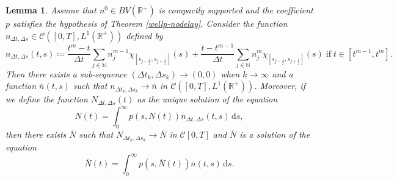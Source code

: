 \documentclass[11pt,a4paper]{article}
\newcommand{\R}{\mathbb{R}}
\newcommand{\N}{\mathbb{N}}
\newcommand{\dd}{\mathrm{d}}
\newtheorem{lemma}{Lemma}[section]
\begin{document}
\begin{lemma}
\label{lim-delta}
    Assume that $n^0\in BV(\R^+)$ is compactly supported and the coefficient $p$ satisfies the hypothesis of Theorem \ref{wellp-nodelay}. Consider the function $n_{\Delta t,\Delta s}\in\mathcal{C}\left([0,T],L^1(\R^+)\right)$ defined by
    \begin{equation}
    \label{n-interp}
      n_{\Delta t,\Delta s}(t,s)\coloneqq\frac{t^m-t}{\Delta t}\sum_{j\in\N}n_j^{m-1}\chi_{[s_{j-\frac{1}{2}},s_{j+\frac{1}{2}}]}(s)+\frac{t-t^{m-1}}{\Delta t}\sum_{j\in\N}n_j^{m}\chi_{[s_{j-\frac{1}{2}},s_{j+\frac{1}{2}}]}(s)\;\textrm{if}\; t\in[t^{m-1},t^{m}].  
    \end{equation}
    Then there exists a sub-sequence $(\Delta t_k,\Delta s_k)\to (0,0)$ when $k\to\infty$ and a function $\overline{n}(t,s)$ such that $n_{\Delta t_k,\Delta s_k}\to\overline{n}$ in $\mathcal{C}\left([0,T],L^1(\R^+)\right)$. Moreover, if we define the function $N_{\Delta t,\Delta s}(t)$ as the unique solution of the equation
 \begin{equation*}
    N(t)=\int_0^\infty p(s,N(t))n_{\Delta t,\Delta s}(t,s)\,\dd s,
   \end{equation*}
   then there exists $\overline{N}$ such that $N_{\Delta t_k,\Delta s_k}\to\overline{N}$ in $\mathcal{C}[0,T]$ and $\overline{N}$ is a solution of the equation
   \begin{equation}
   \label{lim-Nbar}
       \overline{N}(t)=\int_0^\infty p(s,\overline{N}(t))\overline{n}(t,s)\,\dd s.
   \end{equation}
\end{lemma}
\end{document}
